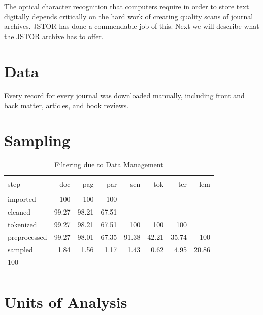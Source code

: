 \documentclass[]{book}
\theoremstyle{definition}
\theoremstyle{definition}
\theoremstyle{definition}
\theoremstyle{remark}
\begin{document}
The optical character recognition that computers require in order to
store text digitally depends critically on the hard work of creating
quality scans of journal archives. JSTOR has done a commendable job of
this. Next we will describe what the JSTOR archive has to offer.

\hypertarget{kd-dd}{%
\section{Data}\label{kd-dd}}

Every record for every journal was downloaded manually, including front
and back matter, articles, and book reviews.

\hypertarget{kd-dp1}{%
\section{Sampling}\label{kd-dp1}}

\begin{table}[!htbp] \centering 
  \caption{Filtering due to Data Management} 
  \label{tab:filt} 
\begin{tabular}{@{\extracolsep{5pt}} lrrrrrrr} 
\\[-1.8ex]\hline 
\hline \\[-1.8ex] 
step & doc & pag & par & sen & tok & ter & lem \\ 
\hline \\[-1.8ex] 
imported & 100 & 100 & 100 &  &  &  &  \\ 
cleaned & 99.27 & 98.21 & 67.51 &  &  &  &  \\ 
tokenized & 99.27 & 98.21 & 67.51 & 100 & 100 & 100 &  \\ 
preprocessed & 99.27 & 98.01 & 67.35 & 91.38 & 42.21 & 35.74 & 100 \\ 
sampled & 1.84 & 1.56 & 1.17 & 1.43 & 0.62 & 4.95 & 20.86 \\ 
100\\%
\hline \\[-1.8ex] 
\end{tabular} 
\end{table}

\hypertarget{units-of-analysis}{%
\section{Units of Analysis}\label{units-of-analysis}}
\end{document}
